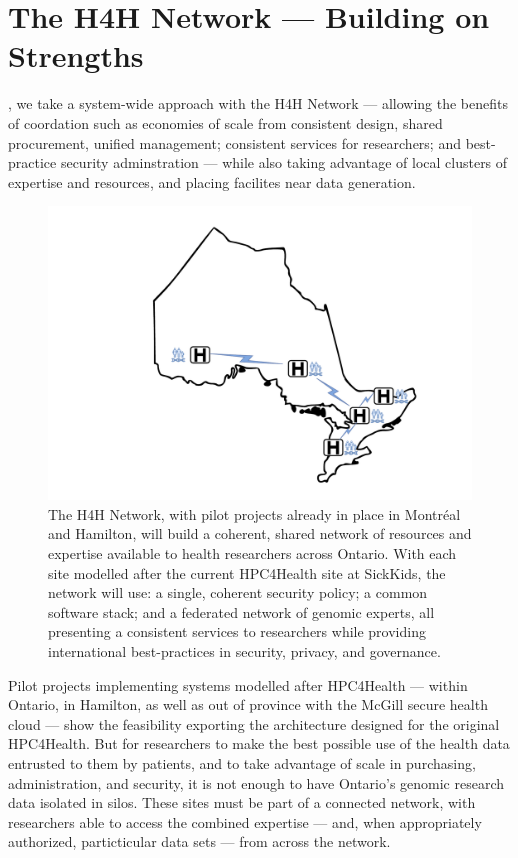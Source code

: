 \documentclass[twoside,symmetric,sfsidenotes,notoc]{tufte-book}
\begin{document}
\chapter{The H4H Network --- Building on Strengths}
\label{ch:hpc4health_network}

,
we take a system-wide approach with the H4H Network --- allowing the benefits of coordation
such as economies of scale from consistent design, shared procurement, unified management;
consistent services for researchers; and best-practice security adminstration --- while also
taking advantage of local clusters of expertise and resources, and placing facilites near
data generation.

\begin{figure}
  \includegraphics{H4HNetwork.pdf}
  \caption[The H4H Network]{The H4H Network, with pilot projects already in place in Montr\'eal and
  Hamilton, will build a coherent, shared network of resources and expertise available to health 
  researchers across Ontario.  With each site modelled after the current HPC4Health site at SickKids,
  the network will use: a single, coherent security policy; a common software stack; and a federated
  network of genomic experts, all presenting a consistent services to researchers while providing 
  international best-practices in security, privacy, and governance.}
  \label{fig:hpc4health_network}
\end{figure}

Pilot projects implementing systems modelled after HPC4Health --- within Ontario, in Hamilton,
as well as out of province with the McGill secure health cloud --- show the feasibility exporting
the architecture designed for the original HPC4Health.  But for researchers to make the best
possible use of the health data entrusted to them by patients, and to take advantage of scale
in purchasing, administration, and security, it is not enough to have Ontario's genomic research
data isolated in silos.  These sites must be part of a connected network, with researchers able
to access the combined expertise --- and, when appropriately authorized, particticular 
data sets --- from across the network.
\end{document}
